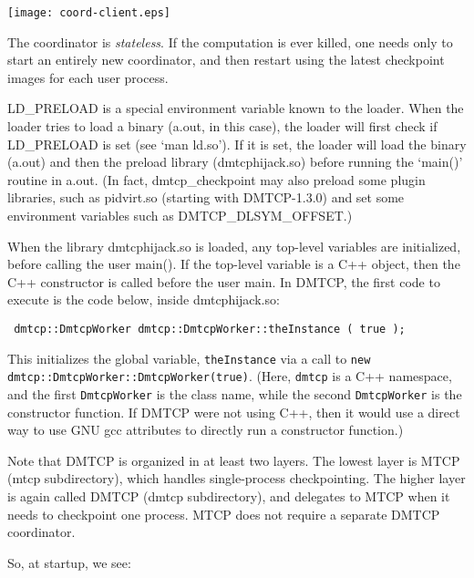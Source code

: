 \documentclass{article}
\begin{document}
\begin{center}
\texttt{[image: coord-client.eps]}
\end{center}

The coordinator is {\em stateless}.  If the computation is ever killed,
one needs only to start an entirely new coordinator, and then restart
using the latest checkpoint images for each user process.

LD\_PRELOAD is a special environment variable known to the loader.
When the loader tries to load a binary (a.out, in this case), the loader
will first check if LD\_PRELOAD is set (see `man ld.so').  If it is
set, the loader will load the binary (a.out) and then the preload library
(dmtcphijack.so) before running the `main()' routine in a.out.
(In fact, dmtcp\_checkpoint may also preload some plugin libraries,
 such as pidvirt.so (starting with DMTCP-1.3.0) and set some
 environment variables such as DMTCP\_DLSYM\_OFFSET.)

When the library dmtcphijack.so is loaded, any top-level variables
are initialized, before calling the user main().  If the top-level variable
is a C++ object, then the C++ constructor is called before the
user main.  In DMTCP, the first code to execute is the code
below, inside dmtcphijack.so:

{\tt
dmtcp::DmtcpWorker dmtcp::DmtcpWorker::theInstance ( true );
}

This initializes the global variable, {\tt theInstance} via a call
to {\tt new dmtcp::DmtcpWorker::DmtcpWorker(true)}.  (Here, {\tt dmtcp}
is a C++ namespace, and the first {\tt DmtcpWorker} is the class name,
while the second {\tt DmtcpWorker} is the constructor function.  If DMTCP were
not using C++, then it would use a direct way to use GNU gcc attributes
to directly run a constructor function.)

Note that DMTCP is organized in at least two layers.  The lowest layer
is MTCP (mtcp subdirectory), which handles single-process checkpointing.
The higher layer is again called DMTCP (dmtcp subdirectory), and delegates
to MTCP when it needs to checkpoint one process.  MTCP does not require
a separate DMTCP coordinator.

So, at startup, we see:
\end{document}
